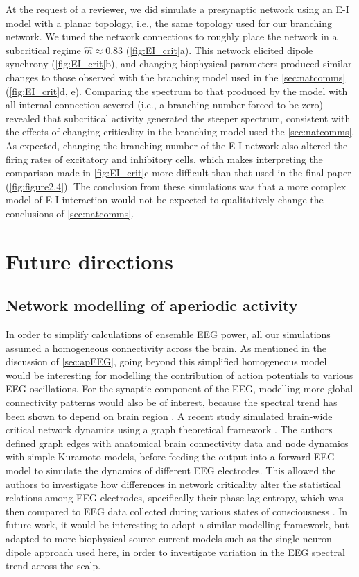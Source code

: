 At the request of a reviewer, we did simulate a presynaptic network using an E-I model with a planar topology, i.e., the same topology used for our branching network. We tuned the network connections to roughly place the network in a subcritical regime $\hat{m}\approx0.83$ (\autoref{fig:EI_crit}a). This network elicited dipole synchrony (\autoref{fig:EI_crit}b), and changing biophysical parameters produced similar changes to those observed with the branching model used in the \autoref{sec:natcomms} (\autoref{fig:EI_crit}d, e). Comparing the spectrum to that produced by the model with all internal connection severed (i.e., a branching number forced to be zero) revealed that subcritical activity generated the steeper spectrum, consistent with the effects of changing criticality in the branching model used the \autoref{sec:natcomms}. As expected, changing the branching number of the E-I network also altered the firing rates of excitatory and inhibitory cells, which makes interpreting the comparison made in \autoref{fig:EI_crit}c more difficult than that used in the final paper (\autoref{fig:figure2.4}). The conclusion from these simulations was that a more complex model of E-I interaction would not be expected to qualitatively change the conclusions of \autoref{sec:natcomms}.

\section{Future directions}

\subsection{Network modelling of aperiodic activity}
In order to simplify calculations of ensemble EEG power, all our simulations assumed a homogeneous connectivity across the brain. As mentioned in the discussion of \autoref{sec:apEEG}, going beyond this simplified homogeneous model would be interesting for modelling the contribution of action potentials to various EEG oscillations. For the synaptic component of the EEG, modelling more global connectivity patterns would also be of interest, because the spectral trend has been shown to depend on brain region \cite{He2010,Gao2020}. A recent study simulated brain-wide critical network dynamics using a graph theoretical framework \cite{LEE2019}. The authors defined graph edges with anatomical brain connectivity data and node dynamics with simple Kuramoto models, before feeding the output into a forward EEG model to simulate the dynamics of different EEG electrodes. This allowed the authors to investigate how differences in network criticality alter the statistical relations among EEG electrodes, specifically their phase lag entropy, which was then compared to EEG data collected during various states of consciousness  \cite{LEE2019}. In future work, it would be interesting to adopt a similar modelling framework, but adapted to more biophysical source current models such as the single-neuron dipole approach used here, in order to investigate variation in the EEG spectral trend across the scalp.

